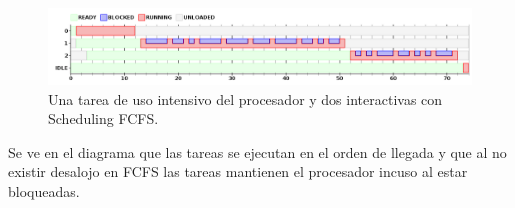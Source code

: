 \begin{figure}[h!]
  \caption{Una tarea de uso intensivo del procesador y dos interactivas con Scheduling FCFS.}
  \centering
    \includegraphics[width=1\textwidth]{img/ejercicio2.png}
\end{figure}

Se ve en el diagrama que las tareas se ejecutan en el orden de llegada y que al no existir desalojo en FCFS las tareas mantienen el procesador incuso al estar bloqueadas.

